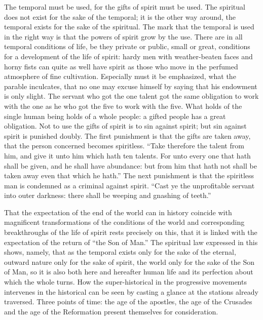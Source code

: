 \documentclass[12pt,a4paper,openany]{book}
\newcommand{\opage}[1]{\marginnote{\footnotesize\textit{[#1]}}}
\begin{document}
The temporal must be used, for the gifts of spirit must
be used. The spiritual does not exist for the sake of the temporal;
it is the other way around, the temporal exists for the sake
of the spiritual. The mark that the temporal
is used in the right way is that the powers of spirit
grow by the use. There are in all temporal conditions of life,
be they private or public, small or great, conditions
for a development of the life of spirit: hardy
men with weather-beaten faces and horny fists can
quite as well have spirit as those who move in the
perfumed atmosphere of fine cultivation. Especially must
it be emphasized, what the parable inculcates, that no one
may excuse himself by saying that his endowment is only slight.
The servant who got the one talent got the same obligation
to work with the one as he who got
the five to work with the five. What holds
of the single human being holds of a whole people:
a gifted people has a great obligation. Not to
use the gifts of spirit is to sin against spirit; but
sin against spirit is punished doubly. The first punishment
is that the gifts are taken away, that the person concerned becomes
spiritless. ``Take therefore the talent from him, and give
it unto him which hath ten talents. For unto every one that
hath shall be given, and he shall have abundance:
but from him that hath not shall be taken away even that
which he hath.'' The next punishment is that the spiritless man
\setcounter{footnote}{0}%
\opage{46}is condemned as a criminal against spirit. ``Cast ye the unprofitable
servant into outer darkness: there shall be weeping
and gnashing of teeth.''

That the expectation of the end of the world can in
history coincide with magnificent transformations
of the conditions of the world and corresponding breakthroughs of
the life of spirit rests precisely on this, that it is linked
with the expectation of the return of ``the Son of Man.''
The spiritual law expressed in this shows, namely,
that as the temporal exists only for the sake of the eternal,
outward nature only for the sake of spirit, the world only
for the sake of the Son of Man, so it is also
both here and hereafter human life and its perfection
about which the whole turns. How the super-historical
in the progressive movements intervenes
in the historical can be seen by casting a glance
at the stations already traversed. Three points of time:
the age of the apostles, the age of the Crusades and the age of the Reformation
present themselves for consideration.
\end{document}
